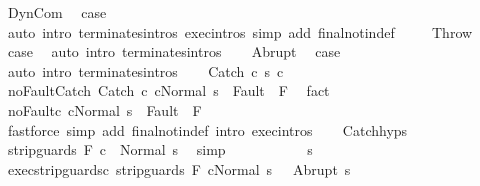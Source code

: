 \begin{isabellebody}
\ DynCom\ \isamarkupfalse%
\ {\isacharquery}case\ \isanewline
\ \ \ \ \isamarkupfalse%
\ {\isacharparenleft}auto\ intro{\isacharcolon}\ terminates{\isachardot}intros\ exec{\isachardot}intros\ simp\ add{\isacharcolon}\ final{\isacharunderscore}notin{\isacharunderscore}def\ {\isacharparenright}\isanewline
{}\isamarkupfalse%
\isanewline
\ \ \isamarkupfalse%
\ Throw\ \isamarkupfalse%
\ {\isacharquery}case\ \isamarkupfalse%
\ {\isacharparenleft}auto\ intro{\isacharcolon}\ terminates{\isachardot}intros{\isacharparenright}\isanewline
{}\isamarkupfalse%
\isanewline
\ \ \isamarkupfalse%
\ Abrupt\ \isamarkupfalse%
\ {\isacharquery}case\ \isamarkupfalse%
\ {\isacharparenleft}auto\ intro{\isacharcolon}\ terminates{\isachardot}intros{\isacharparenright}\isanewline
{}\isamarkupfalse%
\isanewline
\ \ \isamarkupfalse%
\ {\isacharparenleft}Catch\ c{}\ s\ c{}{\isacharparenright}\isanewline
\ \ \isamarkupfalse%
\ noFault{\isacharunderscore}Catch{\isacharcolon}\ {\isachardoublequoteopen}{\isasymGamma}{\isasymturnstile}{\isasymlangle}Catch\ c{}\ c{}{\isacharcomma}Normal\ s\ {\isasymrangle}\ {\isasymRightarrow}{\isasymnotin}Fault\ {\isacharbackquote}\ F{\isachardoublequoteclose}\ \isamarkupfalse%
\ fact\isanewline
\ \ \isamarkupfalse%
\ noFault{\isacharunderscore}c{}{\isacharcolon}\ {\isachardoublequoteopen}{\isasymGamma}{\isasymturnstile}{\isasymlangle}c{}{\isacharcomma}Normal\ s\ {\isasymrangle}\ {\isasymRightarrow}{\isasymnotin}Fault\ {\isacharbackquote}\ F{\isachardoublequoteclose}\isanewline
\ \ \ \ \isamarkupfalse%
\ {\isacharparenleft}fastforce\ simp\ add{\isacharcolon}\ final{\isacharunderscore}notin{\isacharunderscore}def\ intro{\isacharcolon}\ exec{\isachardot}intros{\isacharparenright}\isanewline
\ \ \isamarkupfalse%
\ Catch{\isachardot}hyps\ \isamarkupfalse%
\ {\isachardoublequoteopen}{\isasymGamma}{\isasymturnstile}strip{\isacharunderscore}guards\ F\ c{}\ {\isasymdown}\ Normal\ s{\isachardoublequoteclose}\ \isamarkupfalse%
\ simp\isanewline
\ \ \isamarkupfalse%
\isanewline
\ \ \isacommand{{\isacharbraceleft}}\isamarkupfalse%
\isanewline
\ \ \ \ \isamarkupfalse%
\ s{\isacharprime}\isanewline
\ \ \ \ \isamarkupfalse%
\ exec{\isacharunderscore}strip{\isacharunderscore}guards{\isacharunderscore}c{}{\isacharcolon}\ {\isachardoublequoteopen}{\isasymGamma}{\isasymturnstile}{\isasymlangle}strip{\isacharunderscore}guards\ F\ c{}{\isacharcomma}Normal\ s\ {\isasymrangle}\ {\isasymRightarrow}\ Abrupt\ s{\isacharprime}{\isachardoublequoteclose}\isanewline

\end{isabellebody}
